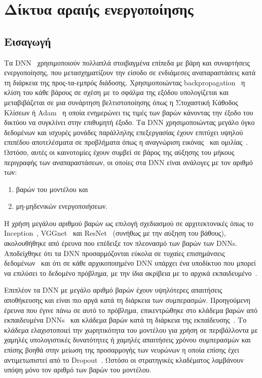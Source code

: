 \chapter{Δίκτυα αραιής ενεργοποίησης}
\label{chapter6}
\graphicspath{{./images/sparsely-activated-networks/}}

\newcommand\figscale{0.16}

\section{Εισαγωγή}
Τα DNN~\cite{lecun2015deep} χρησιμοποιούν πολλαπλά στοιβαγμένα επίπεδα με βάρη και συναρτήσεις ενεργοποίησης, που μετασχηματίζουν την είσοδο σε ενδιάμεσες αναπαραστάσεις κατά τη διάρκεια της προς-τα-εμπρός διάδοσης.
Χρησιμοποιώντας backpropagation~\cite{rumelhart1986learning} η κλίση του κάθε βάρους σε σχέση με το σφάλμα της εξόδου υπολογίζεται και μεταβιβάζεται σε μια συνάρτηση βελτιστοποίησης όπως η Στοχαστική Κάθοδος Κλίσεων ή Adam~\cite{kingma2014adam} η οποία ενημερώνει τις τιμές των βαρών κάνοντας την έξοδο του δικτύου να συγκλίνει στην επιθυμητή έξοδο.
Τα DNN χρησιμοποιώντας μεγάλο όγκο δεδομένων και ισχυρές μονάδες παράλληλης επεξεργασίας έχουν επιτύχει υψηλού επιπέδου αποτελέσματα σε προβλήματα όπως η αναγνώριση εικόνας~\cite{krizhevsky2012imagenet} και ομιλίας~\cite{graves2013speech}.
Ωστόσο, αυτές οι καινοτομίες έχουν συμβεί σε βάρος της αύξησης του μήκους περιγραφής των αναπαραστάσεων, οι οποίες στα DNN είναι ανάλογες με τον αριθμό των:
\begin{enumerate}
	\item βαρών του μοντέλου και
	\item μη-μηδενικών ενεργοποιήσεων.
\end{enumerate}

Η χρήση μεγάλου αριθμού βαρών ως επιλογή σχεδιασμού σε αρχιτεκτονικές όπως το Inception~\cite{szegedy2016rethinking}, VGGnet~\cite{simonyan2014very} και ResNet~\cite{he2016deep} (συνήθως με την αύξηση του βάθους), ακολουθήθηκε από έρευνα που επέδειξε τον πλεονασμό των βαρών των DNNs.
Αποδείχθηκε ότι τα DNN προσαρμόζονται εύκολα σε τυχαίες επισημάνσεις δεδομένων~\cite{zhang2016understanding} και ότι σε κάθε αρχικοποιημένο DNN υπάρχει ένα υποδίκτυο που μπορεί να επιλύσει το δεδομένο πρόβλημα, με την ίδια ακρίβεια με το αρχικά εκπαιδευμένο~\cite{frankle2018lottery}.

Επιπλέον τα DNN με μεγάλο αριθμό βαρών έχουν υψηλότερες απαιτήσεις αποθήκευσης και είναι πιο αργά κατά τη διάρκεια των συμπερασμών.
Προηγούμενη έρευνα που έγινε πάνω σε αυτό το πρόβλημα, επικεντρώθηκε στο κλάδεμα βαρών από εκπαιδευμένα DNNs~\cite{aghasi2017net} και κλάδεμα βαρών κατά τη διάρκεια της εκπαίδευσης~\cite{lin2017runtime}.
Το κλάδεμα ελαχιστοποιεί την χωρητικότητα του μοντέλου για χρήση σε περιβάλλοντα με χαμηλές υπολογιστικές δυνατότητες ή χαμηλές απαιτήσεις χρόνου συμπερασμών και επίσης βοηθά στην μείωση της προσαρμογής των νευρώνων η οποία επίσης έχει αντιμετωπιστεί από το Dropout~\cite{srivastava2014dropout}.
Ωστόσο οι στρατηγικές κλαδέματος λαμβάνουν υπόψη μόνο τον αριθμό των βαρών του μοντέλου.

